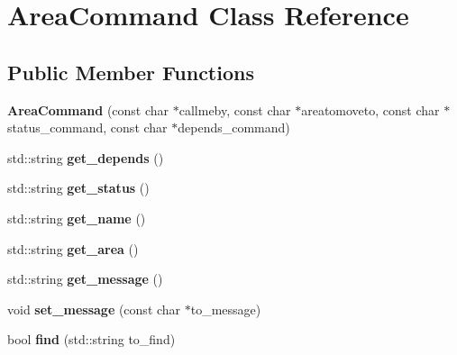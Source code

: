 \hypertarget{class_area_command}{
\section{AreaCommand Class Reference}
\label{class_area_command}
}
\subsection*{Public Member Functions}
\begin{DoxyCompactItemize}
\item 
\hypertarget{class_area_command_aece5bd7ee4bf5a42d580f3d4901548b2}{
{\bfseries AreaCommand} (const char $\ast$callmeby, const char $\ast$areatomoveto, const char $\ast$status\_\-command, const char $\ast$depends\_\-command)}
\label{class_area_command_aece5bd7ee4bf5a42d580f3d4901548b2}

\item 
\hypertarget{class_area_command_a7c24cd88b6913494bfed3b6f6b0fe7f6}{
std::string {\bfseries get\_\-depends} ()}
\label{class_area_command_a7c24cd88b6913494bfed3b6f6b0fe7f6}

\item 
\hypertarget{class_area_command_adc3423bc66eba73317cd941632026b85}{
std::string {\bfseries get\_\-status} ()}
\label{class_area_command_adc3423bc66eba73317cd941632026b85}

\item 
\hypertarget{class_area_command_ad61a6fb1db17d07a2e214c7c2267581d}{
std::string {\bfseries get\_\-name} ()}
\label{class_area_command_ad61a6fb1db17d07a2e214c7c2267581d}

\item 
\hypertarget{class_area_command_a9f558f5ce36040a51401924af9781402}{
std::string {\bfseries get\_\-area} ()}
\label{class_area_command_a9f558f5ce36040a51401924af9781402}

\item 
\hypertarget{class_area_command_a594ec5125fc0467ee001064ff73a1632}{
std::string {\bfseries get\_\-message} ()}
\label{class_area_command_a594ec5125fc0467ee001064ff73a1632}

\item 
\hypertarget{class_area_command_a1a081291614ee6ff8c5841d2753b3b1b}{
void {\bfseries set\_\-message} (const char $\ast$to\_\-message)}
\label{class_area_command_a1a081291614ee6ff8c5841d2753b3b1b}

\item 
\hypertarget{class_area_command_a317a22131f031bbc4f364b1199261829}{
bool {\bfseries find} (std::string to\_\-find)}
\label{class_area_command_a317a22131f031bbc4f364b1199261829}

\end{DoxyCompactItemize}
